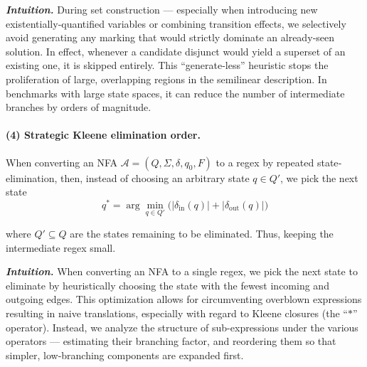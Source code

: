 \medskip
\noindent\textit{\textbf{Intuition.}}
%
During set construction --- especially when introducing new existentially‐quantified variables or combining transition effects, we selectively avoid generating any marking that would strictly dominate an already‐seen solution.  In effect, whenever a candidate disjunct would yield a superset of an existing one, it is skipped entirely.  This ``generate‐less” heuristic stops the proliferation of large, overlapping regions in the semilinear description.  In benchmarks with large state spaces, it can reduce the number of intermediate branches by orders of magnitude.

\paragraph{(4) Strategic Kleene elimination order.}  
When converting an NFA \(\mathcal A=(Q,\Sigma,\delta,q_0,F)\) to a regex by repeated state‐elimination, then, instead of choosing an arbitrary state $q\in Q'$, we pick the next state
\[
q^* = 
	\arg\min_{q\in Q'}\bigl(|\delta_{\mathrm{in}}(q)|+|\delta_{\mathrm{out}}(q)|\bigr)
\]


where \(Q'\subseteq Q\) are the states remaining to be eliminated. Thus, keeping the intermediate regex small.

\medskip
\noindent\textit{\textbf{Intuition.}}
When converting an NFA to a single regex, we pick the next state to eliminate by heuristically choosing the  state with the fewest incoming and outgoing edges.
This optimization allows for circumventing 
overblown expressions resulting in naive translations, especially with regard to  Kleene closures (the “\(\mathsf{*}\)” operator).  Instead, we analyze the structure of sub-expressions under the various operators --- estimating their branching factor, and reordering them so that simpler, low‐branching components are expanded first.  

